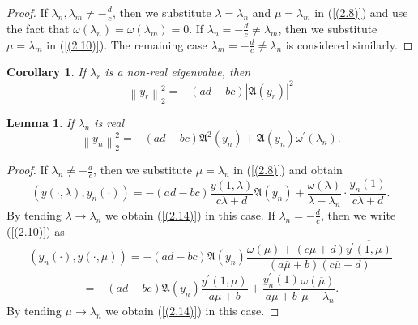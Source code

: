 \documentclass[10pt,a4paper]{amsart}
\newtheorem{cor}[thm]{Corollary}
\newtheorem{lem}[thm]{Lemma}
\numberwithin{equation}{section}
\begin{document}
\begin{proof}
If $\lambda_n,\lambda_m\neq-\frac{d}{c}$, then we substitute  $\lambda=\lambda_n$ and $\mu=\lambda_m$ in (\ref{(2.8)}) and use the fact that $\omega(\lambda_n)=\omega(\lambda_m)=0$.
If \(\lambda_{n}= - \frac{d}{c} \neq \lambda_{m}\), then we substitute $\mu=\lambda_m$ in (\ref{(2.10)}). The remaining case  \(\lambda_{m}= - \frac{d}{c} \neq \lambda_{n}\) is considered similarly.
\end{proof}
\begin{cor}
If $\lambda _{r}$ is a non-real eigenvalue, then
\begin{equation} 
  {\left\| {y_{r} }\right\|}^{2}_{2} = -(ad - bc) {\left| {\mathfrak{A}(y_{r})} \right|^2}\label{(2.13)}
 \end{equation}
\end{cor}

\begin{lem} If $\lambda _{n}$ is real 
\begin{equation}
{\left\| {y_{n} } \right\|}^{2}_{2}=-(ad-bc)\mathfrak{A}^2(y_{n})+\mathfrak{A}(y_{n})\omega^\prime(\lambda_n).
\label{(2.14)}
\end{equation}
\end{lem}
\begin{proof}
If $\lambda_n\neq-\frac{d}{c}$, then we substitute  $\mu=\lambda_n$ in (\ref{(2.8)}) and obtain  
\begin{equation}
\left(y(\cdot,\lambda), y_n(\cdot)\right)
= -(ad - bc)\frac{y(1,\lambda)}{c\lambda + d}\mathfrak{A}(y_{n})
+ \frac{\omega(\lambda)}{\lambda - \lambda_n} \cdot \frac{{y_n(1)}}{c\lambda + d}.\label{(2.15)}
\end{equation}
By tending $\lambda\to\lambda_n$ we obtain (\ref{(2.14)}) in this case.
If \(\lambda_{n}= - \frac{d}{c}\), then we write (\ref{(2.10)}) as
\[
\left(y_n(\cdot), y(\cdot,\mu)\right)
= -(ad - bc)\mathfrak{A}(y_{n})\frac{{\omega(\overline{\mu})+(c\overline{\mu} + d)}\overline{y^\prime(1,\mu)}}{(a\overline{\mu} + b)(c\overline{\mu} + d)}
\]
\begin{equation}
= -(ad - bc)\mathfrak{A}(y_{n})\frac{\overline{y^\prime(1,\mu)}}{a\overline{\mu} + b}+\frac{y_n^\prime(1)}{a\overline{\mu}+b}\frac{\omega(\overline{\mu})}{\overline{\mu}-\lambda_n}. \label{(2.16)}
\end{equation}
By tending $\mu\to\lambda_n$ we obtain (\ref{(2.14)}) in this case.
\end{proof}
\end{document}
